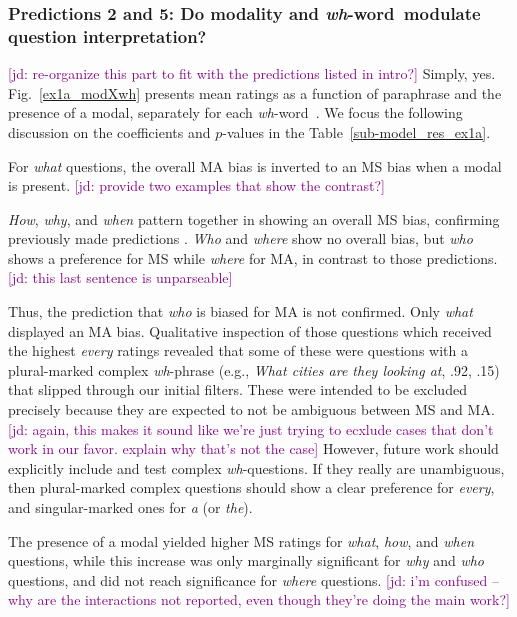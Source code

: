 \documentclass[12pt,letterpaper,table,svgnames,dvipsnames]{article}
\newcommand{\jd}[1]{\textcolor{Purple}{[jd: #1]}}
\newcommand{\tableref}[1]{Table~\ref{#1}}
\newcommand{\figref}[1]{Fig.~\ref{#1}}
\newcommand{\whw}{\emph{wh}-word~}
\begin{document}
\subsubsection{Predictions 2 and 5: Do modality and \whw modulate question interpretation?} \jd{re-organize this part to fit with the predictions listed in intro?}
Simply, yes. \figref{ex1a_modXwh} presents mean ratings as a function of paraphrase and the presence of a modal, separately for each \whw. We focus the following discussion on the coefficients and $p$-values in the \tableref{sub-model_res_ex1a}.

For \emph{what} questions, the overall MA bias is inverted to an MS bias when a modal is present. \jd{provide two examples that show the contrast?}%

\emph{How}, \emph{why}, and \emph{when} pattern together in showing an overall MS bias, confirming previously made predictions \cite{ginzburg1995,asherlascarides1998}. \emph{Who} and \emph{where} show no overall bias, but \emph{who} shows a preference for MS while \emph{where} for MA, in contrast to those predictions. \jd{this last sentence is unparseable}


Thus, the prediction that \emph{who} is biased for MA is not confirmed. Only \emph{what} displayed an MA bias. Qualitative inspection of those questions which received the highest \emph{every} ratings revealed that some of these were questions with a plural-marked complex \emph{wh}-phrase (e.g., \emph{What cities are they looking at}, .92, .15) that slipped through our initial filters. These were intended to be excluded precisely because they are expected to not be ambiguous between MS and MA. \jd{again, this makes it sound like we're just trying to ecxlude cases that don't work in our favor. explain why that's not the case} However, future work should explicitly include and test complex \emph{wh}-questions. If they really are unambiguous, then plural-marked complex questions should show a clear preference for \emph{every}, and singular-marked ones for \emph{a} (or \emph{the}).

The presence of a modal yielded higher MS ratings for \emph{what}, \emph{how}, and \emph{when} questions, while this increase was only marginally significant for  \emph{why} and \emph{who} questions, and did not reach significance for \emph{where} questions. \jd{i'm confused -- why are the interactions not reported, even though they're doing the main work?} 
\end{document}
